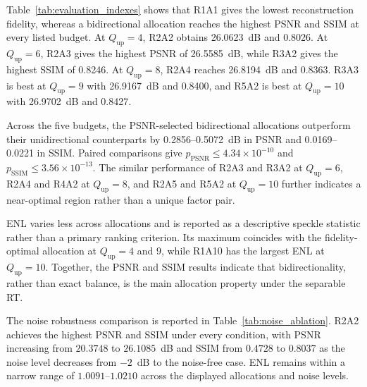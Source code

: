 \documentclass[conference]{IEEEtran}
\begin{document}
Table~\ref{tab:evaluation_indexes} shows that R1A1 gives the lowest reconstruction fidelity, whereas a bidirectional allocation reaches the highest PSNR and SSIM at every listed budget. At $Q_{\mathrm{up}}=4$, R2A2 obtains 26.0623~dB and 0.8026. At $Q_{\mathrm{up}}=6$, R2A3 gives the highest PSNR of 26.5585~dB, while R3A2 gives the highest SSIM of 0.8246. At $Q_{\mathrm{up}}=8$, R2A4 reaches 26.8194~dB and 0.8363. R3A3 is best at $Q_{\mathrm{up}}=9$ with 26.9167~dB and 0.8400, and R5A2 is best at $Q_{\mathrm{up}}=10$ with 26.9702~dB and 0.8427.

Across the five budgets, the PSNR-selected bidirectional allocations outperform their unidirectional counterparts by 0.2856--0.5072~dB in PSNR and 0.0169--0.0221 in SSIM. Paired comparisons give $p_{\mathrm{PSNR}}\leq4.34\times10^{-10}$ and $p_{\mathrm{SSIM}}\leq3.56\times10^{-13}$. The similar performance of R2A3 and R3A2 at $Q_{\mathrm{up}}=6$, R2A4 and R4A2 at $Q_{\mathrm{up}}=8$, and R2A5 and R5A2 at $Q_{\mathrm{up}}=10$ further indicates a near-optimal region rather than a unique factor pair.

ENL varies less across allocations and is reported as a descriptive speckle statistic rather than a primary ranking criterion. Its maximum coincides with the fidelity-optimal allocation at $Q_{\mathrm{up}}=4$ and 9, while R1A10 has the largest ENL at $Q_{\mathrm{up}}=10$. Together, the PSNR and SSIM results indicate that bidirectionality, rather than exact balance, is the main allocation property under the separable RT.

The noise robustness comparison is reported in Table~\ref{tab:noise_ablation}. R2A2 achieves the highest PSNR and SSIM under every condition, with PSNR increasing from $20.3748$ to $26.1085$~dB and SSIM from $0.4728$ to $0.8037$ as the noise level decreases from $-2$~dB to the noise-free case. ENL remains within a narrow range of $1.0091$--$1.0210$ across the displayed allocations and noise levels.
\end{document}
